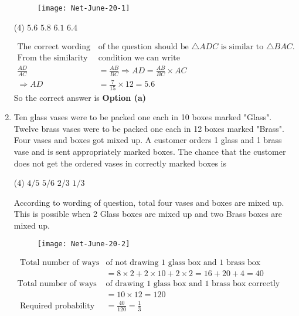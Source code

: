 \begin{enumerate}
\begin{figure}[H]
	\centering
	\texttt{[image: Net-June-20-1]}
\end{figure}	
 \begin{tasks}(4)
	\task[\textbf{a.}]$5.6$
	\task[\textbf{b.}]$5.8$
	\task[\textbf{c.}] $6.1$
	\task[\textbf{d.}]$6.4$ 
\end{tasks}
\begin{answer}
	\begin{align*}
\text{The correct wording }&\text{of the question should be $\triangle A D C$ is similar to $\triangle B A C$.}\\
	\text{From the similarity }&\text{condition we can write}\\
	\frac{A D}{A C}&=\frac{A B}{B C} \Rightarrow A D=\frac{A B}{B C} \times A C \\
	\Rightarrow A D&=\frac{7}{15} \times 12=5.6
	\end{align*}
	So the correct answer is \textbf{Option (a)}
\end{answer}
\item Ten glass vases were to be packed one each in 10 boxes marked "Glass". Twelve brass vases were to be packed one each in 12 boxes marked "Brass". Four vases and boxes got mixed up. A customer orders 1 glass and 1 brass vase and is sent appropriately marked boxes. The chance that the customer does not get the ordered vases in correctly marked boxes is
 \begin{tasks}(4)
	\task[\textbf{a.}]$4 / 5$
	\task[\textbf{b.}]$5 / 6$
	\task[\textbf{c.}]$2 / 3$
	\task[\textbf{d.}] $1 / 3$
\end{tasks}
\begin{answer}
	 According to wording of question, total four vases and boxes are mixed up. This is possible when 2 Glass boxes are mixed up and two Brass boxes are mixed up.
	 \begin{figure}[H]
	 	\centering
	 	\texttt{[image: Net-June-20-2]}
	 \end{figure}
	\begin{align*}
\text{	Total number of ways }&\text{of not drawing 1 glass box and 1 brass box correctly}\\
	&=8 \times 2+2 \times 10+2 \times 2=16+20+4=40\\
	\text{Total number of ways }&\text{of drawing 1 glass box and 1 brass box correctly}\\
	&=10 \times 12=120\\
\text{	Required probability }&=\frac{40}{120}=\frac{1}{3}

\end{align*}
\end{answer}
\end{enumerate}

